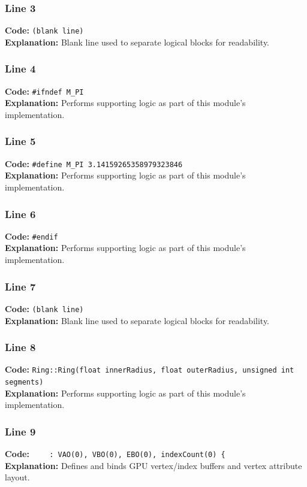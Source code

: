 \documentclass[11pt,a4paper]{article}
\begin{document}
\subsubsection*{Line 3}
\textbf{Code:} \texttt{(blank line)}\\
\textbf{Explanation:} Blank line used to separate logical blocks for readability.

\subsubsection*{Line 4}
\textbf{Code:} \verb|#ifndef M_PI|\\
\textbf{Explanation:} Performs supporting logic as part of this module's implementation.

\subsubsection*{Line 5}
\textbf{Code:} \verb|#define M_PI 3.14159265358979323846|\\
\textbf{Explanation:} Performs supporting logic as part of this module's implementation.

\subsubsection*{Line 6}
\textbf{Code:} \verb|#endif|\\
\textbf{Explanation:} Performs supporting logic as part of this module's implementation.

\subsubsection*{Line 7}
\textbf{Code:} \texttt{(blank line)}\\
\textbf{Explanation:} Blank line used to separate logical blocks for readability.

\subsubsection*{Line 8}
\textbf{Code:} \verb|Ring::Ring(float innerRadius, float outerRadius, unsigned int segments) |\\
\textbf{Explanation:} Performs supporting logic as part of this module's implementation.

\subsubsection*{Line 9}
\textbf{Code:} \verb|    : VAO(0), VBO(0), EBO(0), indexCount(0) {|\\
\textbf{Explanation:} Defines and binds GPU vertex/index buffers and vertex attribute layout.
\end{document}
